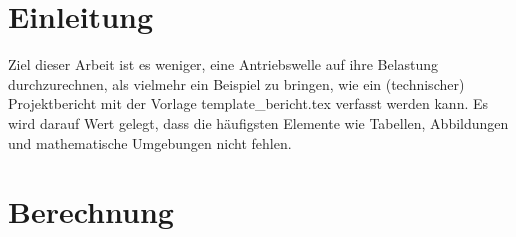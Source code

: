 \documentclass[
a4paper,     %
 headsepline, %
 halfparskip,     %
 fleqn,       %
12pt         %
]{scrartcl}  %
\begin{document}

 \maketitle



 \tableofcontents

 \listoffigures

 \listoftables

 \newpage





\section{Einleitung}
\label{sec:einleitung}

Ziel dieser Arbeit ist es weniger, eine Antriebswelle auf ihre Belastung durchzurechnen, als vielmehr ein Beispiel zu bringen, wie ein (technischer) Projektbericht mit der Vorlage \textsf{template\_bericht.tex} verfasst werden kann. Es wird darauf Wert gelegt, dass die häufigsten Elemente wie Tabellen, Abbildungen und mathematische Umgebungen nicht fehlen.


\section{Berechnung}
\label{sec:berechnung}
\end{document}
